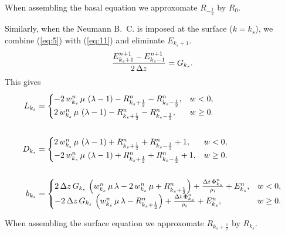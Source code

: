 \documentclass{article}
\begin{document}
When assembling the basal equation we approxomate $R_{-\frac{1}{2}}$ by $R_{0}$.

\newcommand{\ks}{k_{s}}

Similarly, when the Neumann B.~C. is imposed at the surface ($k =
\ks$), we combine (\ref{eq:5}) with (\ref{eq:11}) and eliminate $E_{\ks+1}$.
\begin{equation}
  \label{eq:11}
  \frac{E^{n+1}_{k_{s}+1}-E^{n+1}_{k_{s}-1}}{2\,\Delta z}=G_{k_{s}}.
\end{equation}
This gives
\begin{align}
  \wcases{L_{\ks}}{\Lms}{\Lps}\\
  \notag\\
  \wcases{D_{\ks}}{\Dms}{\Dps}\\
  \notag\\
  \wcases{b_{\ks}}{\Bms}{\Bps}
\end{align}

When assembling the surface equation we approxomate $R_{\ks + \frac{1}{2}}$ by $R_{\ks}$.
\end{document}
